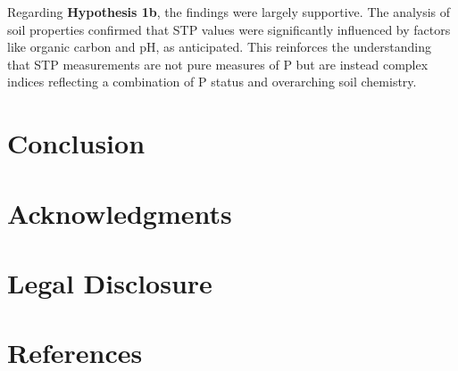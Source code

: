\documentclass[
  a4paper,
]{article}
\begin{document}
Regarding \textbf{Hypothesis 1b}, the findings were largely supportive.
The analysis of soil properties confirmed that STP values were
significantly influenced by factors like organic carbon and pH, as
anticipated. This reinforces the understanding that STP measurements are
not pure measures of P but are instead complex indices reflecting a
combination of P status and overarching soil chemistry.

\section{Conclusion}\label{conclusion}

\section{Acknowledgments}\label{acknowledgments}

\section{Legal Disclosure}\label{legal-disclosure}

\newpage

\section{References}\label{references}
\end{document}
